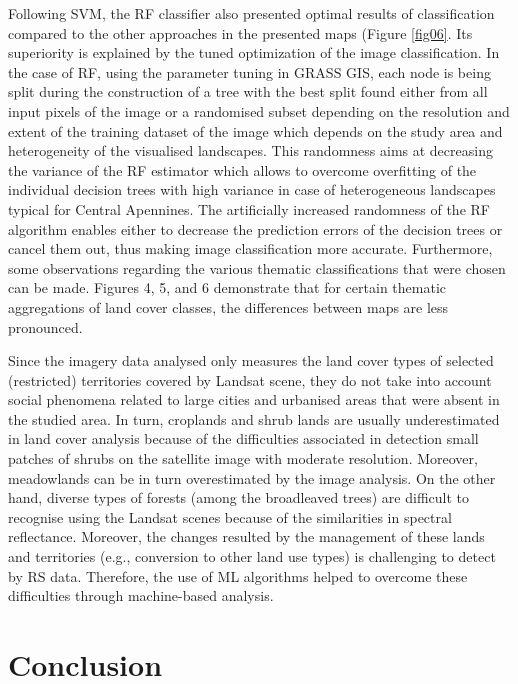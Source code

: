 \documentclass[remotesensing,article,submit,pdftex,moreauthors]{Definitions/mdpi}
\begin{document}
Following SVM, the RF classifier also presented optimal results of classification compared to the other approaches in the presented maps (Figure \ref{fig06}. Its superiority is explained by the tuned optimization of the image classification. In the case of RF, using the parameter tuning in GRASS GIS, each node is being split during the construction of a tree with the best split found either from all input pixels of the image or a randomised subset depending on the resolution and extent of the training dataset of the image which depends on the study area and heterogeneity of the visualised landscapes. This randomness aims at decreasing the variance of the RF estimator which allows to overcome overfitting of the individual decision trees with high variance in case of heterogeneous landscapes typical for Central Apennines. The artificially increased randomness of the RF algorithm enables either to decrease the prediction errors of the decision trees or cancel them out, thus making image classification more accurate. Furthermore, some observations regarding the various thematic classifications that were chosen can be made.  Figures 4, 5, and 6 demonstrate that for certain thematic aggregations of land cover classes, the differences between maps are less pronounced.

Since the imagery data analysed only measures the land cover types of selected (restricted) territories covered by Landsat scene, they do not take into account social phenomena related to large cities and urbanised areas that were absent in the studied area. In turn, croplands and shrub lands are usually underestimated in land cover analysis because of the difficulties associated in detection small patches of shrubs on the satellite image with moderate resolution. Moreover, meadowlands can be in turn overestimated by the image analysis. On the other hand, diverse types of forests (among the broadleaved trees) are difficult to recognise using the Landsat scenes because of the similarities in spectral reflectance. Moreover, the changes resulted by the management of these lands and territories (e.g., conversion to other land use types) is challenging to detect by RS data. Therefore, the use of ML algorithms helped to overcome these difficulties through machine-based analysis.

\section{Conclusion}
\label{sec5}
\end{document}

